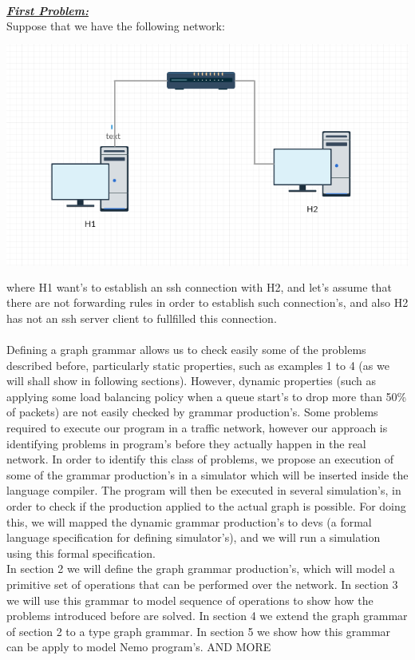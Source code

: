 \documentclass[envcountsect,runningheads]{llncs}
\begin{document}
\\
\textbf{\underline{\textit{First Problem:}}} \\
Suppose that we have the following network:\\
\includegraphics[width=\textwidth, height=8cm]{first_example.png}  
where H1 want's to establish an ssh 
connection with H2, and let's assume that there are not forwarding rules in 
order to establish such connection's, and also H2 has not an ssh server client to 
fullfilled this connection. \\
\\
Defining a graph grammar allows us to check easily some of the problems described 
before, particularly static properties, such as examples 1 to 4 (as we will shall show in following
sections). However, dynamic properties (such as applying some load balancing policy when a 
queue start's to drop more than 50\% of packets) are not easily checked by grammar 
production's. Some problems required to execute our program in a traffic network, 
however our approach is identifying problems in program's before they actually 
happen in the real network. In order to identify this class of problems, we 
propose an execution of some of the grammar production's in a simulator which 
will be inserted inside the language compiler. The program will then be executed 
in several simulation's, in order to check if the production applied to the actual graph is 
possible. For doing this, we will mapped the dynamic grammar production's to 
devs (a formal language specification for defining simulator's), and we will run a simulation 
using this formal specification.\\
In section 2 we will define the graph grammar production's, which will model a 
primitive set of operations that can be performed over the network. In section 3 
we will use this grammar to model sequence of operations to show how 
the problems introduced before are solved. In section 4 we extend the graph grammar of 
section 2 to a type graph grammar. In section 5 we show how this grammar can be 
apply to model Nemo program's. AND MORE  
\end{document}
